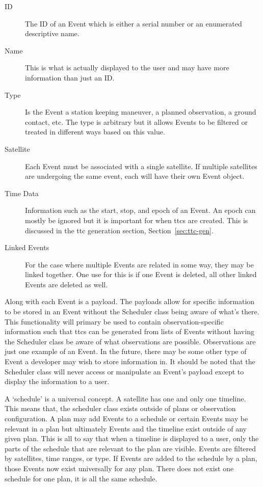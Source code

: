 \begin{description} 

    \item[ID] The ID of an Event which is either a serial number or an
	enumerated descriptive name.

    \item[Name] This is what is actually displayed to the user and may have
	more information than just an ID.

    \item[Type] Is the Event a station keeping maneuver, a planned observation,
	a ground contact, etc. The type is arbitrary but it allows Events to be
	filtered or treated in different ways based on this value.

    \item[Satellite] Each Event must be associated with a single satellite. If
	multiple satellites are undergoing the same event, each will have their
	own Event object.

    \item[Time Data] Information such as the start, stop, and epoch of an
	Event. An epoch can mostly be ignored but it is important for when
	\glspl{ttc} are created. This is discussed in the \gls{ttc} generation
	section, Section~\ref{sec:ttc-gen}.

    \item[Linked Events] For the case where multiple Events are related in some
	way, they may be linked together. One use for this is if one Event is
	deleted, all other linked Events are deleted as well.

\end{description} 

Along with each Event is a payload. The payloads allow for specific information
to be stored in an Event without the Scheduler class being aware of what's
there. This functionality will primary be used to contain observation-specific
information such that \glspl{ttc} can be generated from lists of Events without
having the Scheduler class be aware of what observations are possible.
Observations are just one example of an Event. In the future, there may be some
other type of Event a developer may wish to store information in.  It should be
noted that the Scheduler class will never access or manipulate an Event's
payload except to display the information to a user.

A `schedule' is a universal concept. A satellite has one and only one timeline.
This means that, the scheduler class exists outside of plans or observation
configuration. A plan may add Events to a schedule or certain Events may be
relevant in a plan but ultimately Events and the timeline exist outside of any
given plan. This is all to say that when a timeline is displayed to a user,
only the parts of the schedule that are relevant to the plan are visible.
Events are filtered by satellites, time ranges, or type. If Events are added to
the schedule by a plan, those Events now exist universally for any plan. There
does not exist one schedule for one plan, it is all the same schedule.

